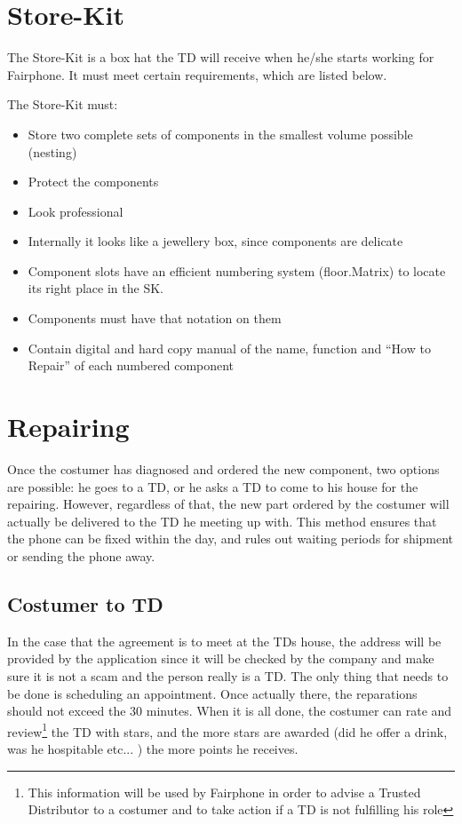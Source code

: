 \documentclass[final]{scrreprt} %
\begin{document}
\clearpage

\section{Store-Kit}\label{sec:StoreKit}
The Store-Kit is a box hat the TD will receive when he/she starts working for Fairphone. It must meet certain requirements, which are listed below.

The Store-Kit must:
\begin{itemize}
	\item Store two complete sets of components in the smallest volume possible (nesting)
	\item Protect the components
	\item Look professional
	\item Internally it looks like a jewellery box, since components are delicate
	\item Component slots have an efficient numbering system (floor.Matrix) to locate its right place in the SK.
	\item Components must have that notation on them
	\item Contain digital and hard copy manual of the name, function and ``How to Repair'' of each numbered component
\end{itemize}

\section{Repairing}
Once the costumer has diagnosed and ordered the new component, two options are possible: he goes to a TD, or he asks a TD to come to his house for the repairing. However, regardless of that, the new part ordered by the costumer will actually be delivered to the TD he meeting up with. This method ensures that the phone can be fixed within the day, and rules out waiting periods for shipment or sending the phone away.



\subsection{Costumer to TD} \label{subsec:costumer2td}
In the case that the agreement is to meet at the TDs house, the address will be provided by the application since it will be checked by the company and make sure it is not a scam and the person really is a TD. The only thing that needs to be done is scheduling an appointment. Once actually there, the reparations should not exceed the 30 minutes. When it is all done, the costumer can rate and review\footnote{This information will be used by Fairphone in order to advise a Trusted Distributor to a costumer and to take action if a TD is not fulfilling his role} the TD with stars, and the more stars are awarded (did he offer a drink, was he hospitable etc... ) the more points he receives.
\end{document}
